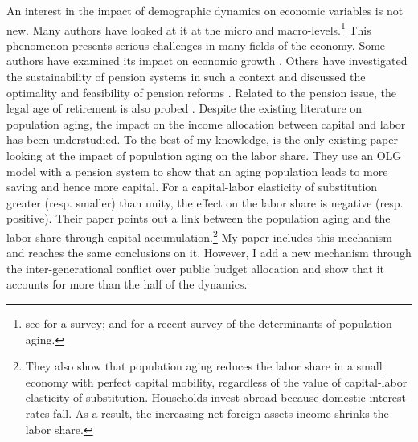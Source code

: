 \documentclass[
]{article}
\begin{document}
An interest in the impact of demographic dynamics on economic variables is not new. Many authors have looked at it at the micro and macro-levels.\footnote{see \citet{Clark1978} for a survey; and \citet{Bloom2016} for a recent survey of the determinants of population aging.}
This phenomenon presents serious challenges in many fields of the economy. Some authors have examined its impact on economic growth \citep[see][]{VanGroezen2005, Soares2005, Bloom2010, Lee2010}. Others have investigated the sustainability of pension systems in such a context \citep[see][]{Ono2003, DelaCroix2013, Philipov2014} and discussed the optimality and feasibility of pension reforms \citep[see][]{Pecchenino1997, Sinn2003}. Related to the pension issue, the legal age of retirement is also probed \citep[see][]{Futagami2001, Dedry2017}. Despite the existing literature on population aging, the impact on the income allocation between capital and labor has been understudied. To the best of my knowledge, \citet{Schmidt2013} is the only existing paper looking at the impact of population aging on the labor share. They use an OLG model with a pension system to show that an aging population leads to more saving and hence more capital. For a capital-labor elasticity of substitution greater (resp. smaller) than unity, the effect on the labor share is negative (resp. positive). Their paper points out a link between the population aging and the labor share through capital accumulation.\footnote{They also show that population aging reduces the labor share in a small economy with perfect capital mobility, regardless of the value of capital-labor elasticity of substitution. Households invest abroad because domestic interest rates fall. As a result, the increasing net foreign assets income shrinks the labor share.} My paper includes this mechanism and reaches the same conclusions on it. However, I add a new mechanism through the inter-generational conflict over public budget allocation and show that it accounts for more than the half of the dynamics.
\end{document}
